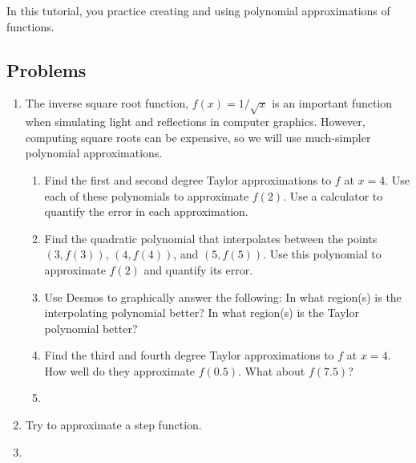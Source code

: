 		\begin{objectives}
			In this tutorial, you practice creating and using polynomial approximations of
			functions.
		\end{objectives}



		\subsection*{Problems}
		
		\begin{enumerate}
			\item  The inverse square root function, $f(x) = 1/\sqrt{x}$ is an important function
			when simulating light and reflections in computer graphics.  However, computing square 
			roots can be expensive, so we will use much-simpler polynomial approximations.
				\begin{enumerate}
					\item Find the first and second degree Taylor approximations to $f$ at $x=4$.
					Use each of these polynomials to approximate $f(2)$. Use a calculator 
					to quantify the error in each approximation.
					\item Find the quadratic polynomial that interpolates between the points 
					$(3,f(3))$, $(4,f(4))$, and $(5,f(5))$. 
					Use this polynomial to approximate $f(2)$ and quantify its error.

					\item Use Desmos to graphically answer the following: 
					In what region(s) is the interpolating polynomial better?
					In what region(s) is the Taylor polynomial better?

					\item Find the third and fourth degree Taylor approximations to $f$ at $x=4$.
					How well do they approximate $f(0.5)$. What about $f(7.5)$?

					\item %
				\end{enumerate}

				\item %
                Try to approximate a step function.

				\item %
		\end{enumerate}
